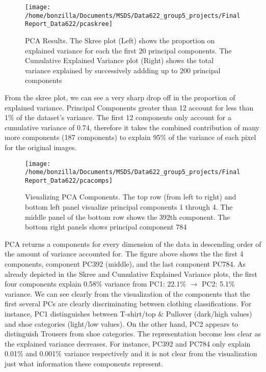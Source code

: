 \documentclass{article}
\begin{document}
\begin{figure}

{\centering \texttt{[image: /home/bonzilla/Documents/MSDS/Data622\_group5\_projects/FinalReport\_Data622/pcaskree]} 

}

\caption{PCA Results. The Skree plot (Left) shows the proportion on explained variance for each the first 20 principal components. The Cumulative Explained Variance plot (Right) shows the total variance explained by successively addding up to 200 principal components}\label{fig:unnamed-chunk-5}
\end{figure}

From the skree plot, we can see a very sharp drop off in the proportion
of explained variance. Principal Components greater than 12 account for
less than 1\% of the dataset's variance. The first 12 components only
account for a cumulative variance of 0.74, therefore it takes the
combined contribution of many more components (187 components) to
explain 95\% of the variance of each pixel for the original images.

\begin{figure}

{\centering \texttt{[image: /home/bonzilla/Documents/MSDS/Data622\_group5\_projects/FinalReport\_Data622/pcacomps]} 

}

\caption{Visualizing PCA Components. The top row (from left to right) and bottom left panel visualize principal components 1 through 4. The middle panel of the bottom row shows the 392th component. The bottom right panels shows principal component 784}\label{fig:unnamed-chunk-6}
\end{figure}

PCA returns a components for every dimension of the data in descending
order of the amount of variance accounted for. The figure above shows
the the first 4 components, component PC392 (middle), and the last
component PC784. As already depicted in the Skree and Cumulative
Explained Variance plots, the first four components explain 0.58\%
variance from PC1: 22.1\% \(\rightarrow\) PC2: 5.1\% variance. We can
see clearly from the visualization of the components that the first
several PCs are clearly discriminating between clothing classifications.
For instance, PC1 distinguishes between T-shirt/top \& Pullover
(dark/high values) and shoe categories (light/low values). On the other
hand, PC2 appears to distinguish Trousers from shoe categories. The
representation become less clear as the explained variance decreases.
For instance, PC392 and PC784 only explain 0.01\% and 0.001\% variance
respectively and it is not clear from the visualization just what
information these components represent.
\end{document}
